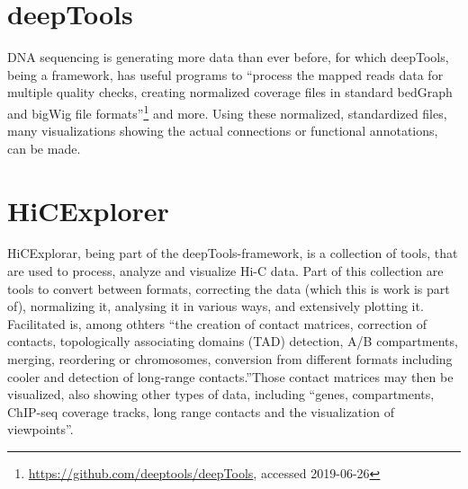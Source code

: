 \section{deepTools}\label{sec:deeptools}

DNA sequencing is generating more data than ever before, for which deepTools,
being a framework, has useful programs to ``process the mapped reads data for
multiple quality checks, creating normalized coverage files in standard
bedGraph and bigWig file
formats''\footnote{\url{https://github.com/deeptools/deepTools}, accessed
2019-06-26} and more. Using these normalized, standardized files, many
visualizations showing the actual connections or functional
annotations, can be made.


\section{HiCExplorer}\label{sec:hicexplorer}

HiCExplorar, being part of the deepTools-framework, is a collection of tools,
that are used to process, analyze and visualize Hi-C data. Part of this
collection are tools to convert between formats, correcting the data (which
this is work is part of), normalizing it, analysing it in various ways, and
extensively plotting it. Facilitated is, among othters ``the creation of
contact matrices, correction of contacts, topologically associating domains
(TAD) detection, A/B compartments, merging, reordering or chromosomes,
conversion from different formats including cooler and detection of long-range
contacts.''\footnotemark Those contact matrices may then be visualized, also
showing other types of data, including ``genes, compartments, ChIP-seq coverage
tracks, long range contacts and the visualization of
viewpoints''\footnotemark[\value{footnote}].




